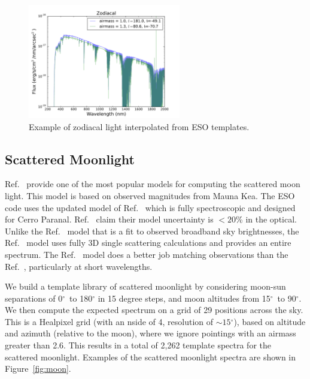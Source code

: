 \documentclass[]{spie}
\newcommand\degree{{^\circ}}
\begin{document}
\begin{figure}[ht]
  \begin{center}
  \includegraphics[height=5cm]{plots/zodiacal.pdf}
  \end{center}
  \caption{Example of zodiacal light interpolated from ESO templates. \label{fig:zodiacal}}
\end{figure}


\subsection{Scattered Moonlight}

Ref.~ provide one of the most popular models for computing the scattered moon light. This model is based on observed magnitudes from Mauna Kea. The ESO code uses the updated model of Ref.~ which is fully spectroscopic and designed for Cerro Paranal. Ref.~ claim their model uncertainty is $<20$\% in the optical.  Unlike the Ref.~ model that is a fit to observed broadband sky brightnesses, the Ref.~ model uses fully 3D single scattering calculations and provides an entire spectrum. The Ref.~ model does a better job matching observations than the Ref.~, particularly at short wavelengths.

We build a template library of scattered moonlight by considering moon-sun separations of 0$\degree$\ to 180$\degree$ in 15 degree steps, and moon altitudes from 15$\degree$\ to 90$\degree$.  We then compute the expected spectrum on a grid of 29 positions across the sky. This is a Healpixel grid (with an nside of 4, resolution of $\sim15\degree$), based on altitude and azimuth (relative to the moon), where we ignore pointings with an airmass greater than 2.6. This results in a total of 2,262 template spectra for the scattered moonlight. Examples of the scattered moonlight spectra are shown in Figure~\ref{fig:moon}.
\end{document}
